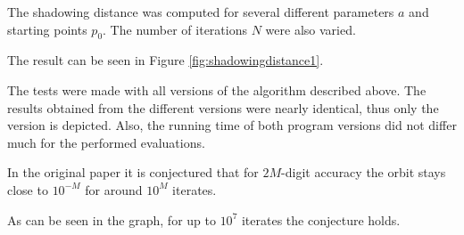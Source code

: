   The shadowing distance was computed for several different parameters $a$ and starting points $p_0$. 
  The number of iterations $N$ were also varied. 

  The result can be seen in Figure \ref{fig:shadowingdistance1}. 
  
  The tests were made with all versions of the algorithm described above.
  The results obtained from the different versions were nearly identical, thus
  only the \irram version is depicted.
  Also, the running time of both program versions did not differ much for
  the performed  evaluations.

  In the original paper it is conjectured that for $2M$-digit
  accuracy the orbit stays close to $10^{-M}$ for around $10^M$ iterates.

  As can be seen in the graph, for up to $10^7$ iterates the conjecture holds. 
